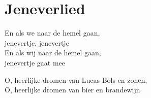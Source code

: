 \section{Jeneverlied}
En als we naar de hemel gaan,\\
jenevertje, jenevertje\\
En als wij naar de hemel gaan,\\
jenevertje gaat mee

O, heerlijke dromen van Lucas Bols en zonen,\\ O, heerlijke dromen van bier en brandewijn

